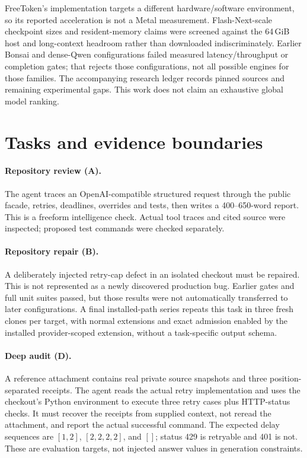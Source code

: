 \documentclass[11pt]{article}
\begin{document}
FreeToken's implementation targets a different hardware/software environment, so its reported acceleration is not a Metal measurement. Flash-Next-scale checkpoint sizes and resident-memory claims were screened against the 64\,GiB host and long-context headroom rather than downloaded indiscriminately. Earlier Bonsai and dense-Qwen configurations failed measured latency/throughput or completion gates; that rejects those configurations, not all possible engines for those families. The accompanying research ledger records pinned sources and remaining experimental gaps. This work does not claim an exhaustive global model ranking.

\section{Tasks and evidence boundaries}
\paragraph{Repository review (A).} The agent traces an OpenAI-compatible structured request through the public facade, retries, deadlines, overrides and tests, then writes a 400--650-word report. This is a freeform intelligence check. Actual tool traces and cited source were inspected; proposed test commands were checked separately.
\paragraph{Repository repair (B).} A deliberately injected retry-cap defect in an isolated checkout must be repaired. This is not represented as a newly discovered production bug. Earlier gates and full unit suites passed, but those results were not automatically transferred to later configurations. A final installed-path series repeats this task in three fresh clones per target, with normal extensions and exact admission enabled by the installed provider-scoped extension, without a task-specific output schema.
\paragraph{Deep audit (D).} A reference attachment contains real private source snapshots and three position-separated receipts. The agent reads the actual retry implementation and uses the checkout's Python environment to execute three retry cases plus HTTP-status checks. It must recover the receipts from supplied context, not reread the attachment, and report the actual successful command. The expected delay sequences are $[1,2]$, $[2,2,2,2]$, and $[]$; status 429 is retryable and 401 is not. These are evaluation targets, not injected answer values in generation constraints.
\end{document}
